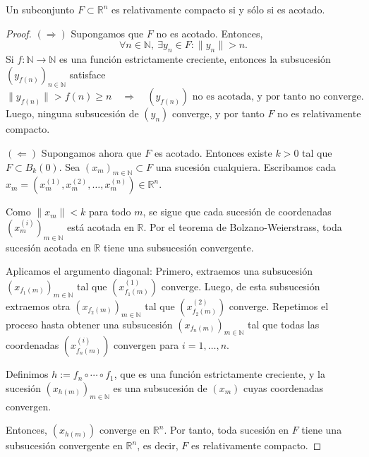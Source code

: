 \clearpage

\begin{prop}
  Un subconjunto \(F \subset \mathbb{R}^n\) es relativamente compacto si y sólo si es acotado.
  \begin{proof}
    \((\Rightarrow)\) Supongamos que \(F\) no es acotado. Entonces,
    \[
      \forall n \in \mathbb{N},\ \exists y_n \in F : \|y_n\| > n.
    \]
    Si \(f : \mathbb{N} \to \mathbb{N} \) es una función estrictamente creciente, entonces la subsucesión \({(y_{f(n)})}_{n \in \mathbb{N}} \) satisface
    \[
      \|y_{f(n)}\| > f(n) \geq n \quad \Rightarrow \quad (y_{f(n)}) \text{ no es acotada, y por tanto no converge}.
    \]
    Luego, ninguna subsucesión de \((y_n)\) converge, y por tanto \(F\) no es relativamente compacto.

    \medskip

    \((\Leftarrow)\) Supongamos ahora que \(F\) es acotado. Entonces existe \(k > 0\) tal que \(F \subset B_k(0)\).
    Sea \({(x_m)}_{m \in \mathbb{N}} \subset F\) una sucesión cualquiera.
    Escribamos cada \(x_m = (x_{m}^{(1)}, x_{m}^{(2)}, \dots, x_{m}^{(n)}) \in \mathbb{R}^n\).

    Como \( \|x_m\| < k\) para todo \(m\), se sigue que cada sucesión de coordenadas \({(x_m^{(i)})}_{m \in \mathbb{N}} \) está acotada en \(\mathbb{R} \).
    Por el teorema de Bolzano-Weierstrass, toda sucesión acotada en \(\mathbb{R} \) tiene una subsucesión convergente.

    Aplicamos el argumento diagonal:
    Primero, extraemos una subsucesión \({(x_{f_1(m)})}_{m \in \mathbb{N}} \) tal que \((x_{f_1(m)}^{(1)})\) converge.
    Luego, de esta subsucesión extraemos otra \({(x_{f_2(m)})}_{m \in \mathbb{N}} \) tal que \((x_{f_2(m)}^{(2)})\) converge.
    Repetimos el proceso hasta obtener una subsucesión \({(x_{f_n(m)})}_{m \in \mathbb{N}} \) tal que todas las coordenadas \((x_{f_n(m)}^{(i)})\) convergen para \(i = 1, \dots, n\).

    Definimos \(h := f_n \circ \cdots \circ f_1\), que es una función estrictamente creciente, y la sucesión \({(x_{h(m)})}_{m \in \mathbb{N}} \) es una subsucesión de \((x_m)\) cuyas coordenadas convergen.

    Entonces, \((x_{h(m)})\) converge en \(\mathbb{R}^n\).
    Por tanto, toda sucesión en \(F\) tiene una subsucesión convergente en \(\mathbb{R}^n\), es decir, \(F\) es relativamente compacto.
  \end{proof}
\end{prop}

